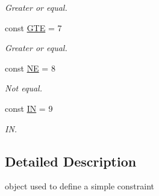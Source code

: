 \begin{DoxyCompactItemize}
\begin{DoxyCompactList}\small\item\em Greater or equal. \end{DoxyCompactList}\item 
\hypertarget{classconstraint_a7271610e95f862dfcbfeebdc22c1be05}{const \hyperlink{classconstraint_a7271610e95f862dfcbfeebdc22c1be05}{G\-T\-E} = 7}\label{classconstraint_a7271610e95f862dfcbfeebdc22c1be05}

\begin{DoxyCompactList}\small\item\em Greater or equal. \end{DoxyCompactList}\item 
\hypertarget{classconstraint_a7e396087ac8d1599de8c52809d56f601}{const \hyperlink{classconstraint_a7e396087ac8d1599de8c52809d56f601}{N\-E} = 8}\label{classconstraint_a7e396087ac8d1599de8c52809d56f601}

\begin{DoxyCompactList}\small\item\em Not equal. \end{DoxyCompactList}\item 
\hypertarget{classconstraint_afbfe29cd59c13b70e9a1a73815ae785d}{const \hyperlink{classconstraint_afbfe29cd59c13b70e9a1a73815ae785d}{I\-N} = 9}\label{classconstraint_afbfe29cd59c13b70e9a1a73815ae785d}

\begin{DoxyCompactList}\small\item\em I\-N. \end{DoxyCompactList}\end{DoxyCompactItemize}


\subsection{Detailed Description}
object used to define a simple constraint 

